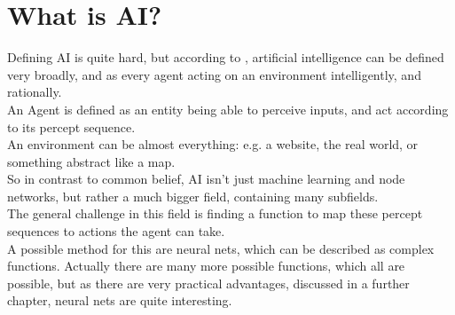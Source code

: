 \chapter{What is AI?}

Defining AI is quite hard, but according to \cite{russellArtificialIntelligenceModern2010}, artificial intelligence can be defined very broadly, and as every agent acting on an environment intelligently, and rationally.\\An Agent is defined as an entity being able to perceive inputs, and act according to its percept sequence.\\ An environment can be almost everything: e.g. a website, the real world, or something abstract like a map.\\ So in contrast to common belief, AI isn't just machine learning and node networks, but rather a much bigger field, containing many subfields.\\
The general challenge in this field is finding a function to map these percept sequences to actions the agent can take. \\ A possible method for this are neural nets, which can be described as complex functions. Actually there are many more possible functions, which all are possible, but as there are very practical advantages, discussed in a further chapter, neural nets are quite interesting.